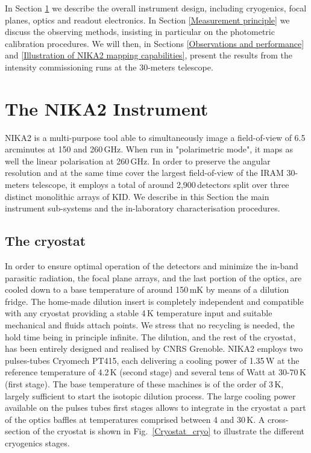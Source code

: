 \documentclass[]{aa} %
\begin{document}
In Section \ref{The NIKA2 Instrument} we describe the overall instrument design, including cryogenics, focal planes, optics and readout electronics. In Section \ref{Measurement principle} we discuss the observing methods, insisting in particular on the photometric calibration procedures. We will then, in Sections \ref{Observations and performance} and \ref{Illustration of NIKA2 mapping capabilities}, present the results from the intensity commissioning runs at the 30-meters telescope. 


\section{The NIKA2 Instrument}
\label{The NIKA2 Instrument}

NIKA2 is a multi-purpose tool able to simultaneously image a field-of-view of 6.5\,arcminutes at 150 and 260\,GHz. When run in "polarimetric mode", it maps as well the linear polarisation  at 260\,GHz. In order to preserve the angular resolution and at the same time cover the largest field-of-view of the IRAM 30-meters telescope, it employs a total of around 2,900\,detectors split over three distinct monolithic arrays of KID. We describe in this Section the main instrument sub-systems and the in-laboratory characterisation procedures.

 \subsection{The cryostat}

In order to ensure optimal operation of the detectors and minimize the in-band parasitic radiation, the focal plane arrays, and the last portion of the optics, are cooled down to a base temperature of around 150\,mK by means of a dilution fridge. The home-made dilution insert is completely independent and compatible with any cryostat providing a stable 4\,K temperature input and suitable mechanical and fluids attach points. We stress that no recycling is needed, the hold time being in principle infinite. The dilution, and the rest of the cryostat, has been entirely designed and realised by CNRS Grenoble. NIKA2 employs two pulses-tubes Cryomech PT415, each delivering a cooling power of 1.35\,W at the reference temperature of 4.2\,K (second stage) and several tens of Watt at 30-70\,K (first stage). The base temperature of these machines is of the order of 3\,K, largely sufficient to start the isotopic dilution process. The large cooling power available on the pulses tubes first stages allows to integrate in the cryostat a part of the optics baffles at temperatures comprised between 4 and 30\,K. A cross-section of the cryostat is shown in Fig.~\ref{Cryostat_cryo} to illustrate the different cryogenics stages.
\end{document}
